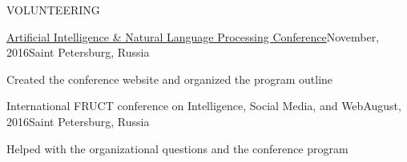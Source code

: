 \documentclass[]{resume} %
\begin{document}
\begin{rSection}{VOLUNTEERING}

	\begin{rSubsection}{\href{https://ainlconf.ru/2016}{Artificial Intelligence \& Natural Language Processing Conference}}{November, 2016}{Saint Petersburg, Russia}{~}
	    \item Created the conference website and organized the program outline
	\end{rSubsection}
	
	\begin{rSubsection}{International FRUCT conference on Intelligence, Social Media, and Web}{August, 2016}{Saint Petersburg, Russia}{~}
	    \item Helped with the organizational questions and the conference program \\[-4.3ex]
	\end{rSubsection}

\end{rSection}


	
	
	
\end{document}
